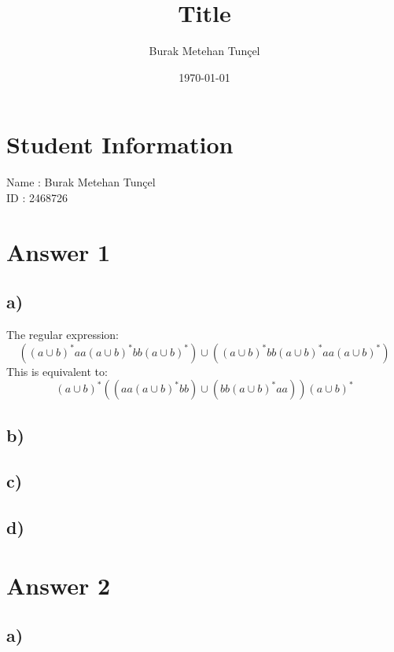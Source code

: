 \documentclass{article}
\title{Title}
\author{Burak Metehan Tunçel}
\date{\today}
\begin{document}
\section*{Student Information}

Name : Burak Metehan Tunçel\\
ID : 2468726\\

\section*{Answer 1}

\subsection*{a)}

The regular expression:
\begin{equation*}
  \left( \left( a \cup b \right)^* aa \left(a \cup b \right)^* bb \left( a \cup b \right)^* \right) \cup \left( \left( a \cup b \right)^* bb \left(a \cup b \right)^* aa \left( a \cup b \right)^* \right)
\end{equation*}
This is equivalent to:
\begin{equation*}
  (a \cup b)^* ((aa (a \cup b)^* bb) \cup (bb (a \cup b)^* aa)) (a \cup b)^*
\end{equation*}

\subsection*{b)}



\newpage
\subsection*{c)}



\subsection*{d)}





\newpage
\section*{Answer 2}

\subsection*{a)}
\end{document}
